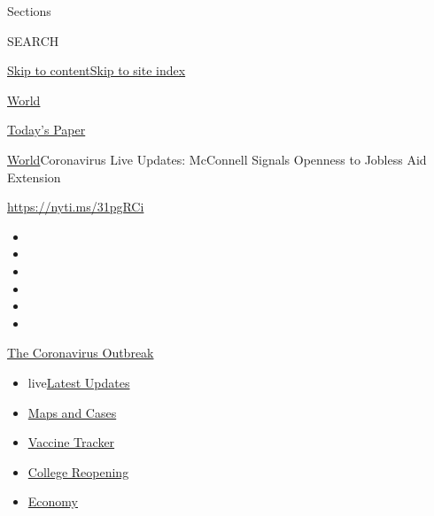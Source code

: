 Sections

SEARCH

\protect\hyperlink{site-content}{Skip to
content}\protect\hyperlink{site-index}{Skip to site index}

\href{https://www.nytimes3xbfgragh.onion/section/world}{World}

\href{https://myaccount.nytimes3xbfgragh.onion/auth/login?response_type=cookie\&client_id=vi}{}

\href{https://www.nytimes3xbfgragh.onion/section/todayspaper}{Today's
Paper}

\href{/section/world}{World}\textbar{}Coronavirus Live Updates:
McConnell Signals Openness to Jobless Aid Extension

\url{https://nyti.ms/31pgRCi}

\begin{itemize}
\item
\item
\item
\item
\item
\item
\end{itemize}

\href{https://www.nytimes3xbfgragh.onion/news-event/coronavirus?action=click\&pgtype=Article\&state=default\&region=TOP_BANNER\&context=storylines_menu}{The
Coronavirus Outbreak}

\begin{itemize}
\tightlist
\item
  live\href{https://www.nytimes3xbfgragh.onion/2020/08/04/world/coronavirus-cases.html?action=click\&pgtype=Article\&state=default\&region=TOP_BANNER\&context=storylines_menu}{Latest
  Updates}
\item
  \href{https://www.nytimes3xbfgragh.onion/interactive/2020/us/coronavirus-us-cases.html?action=click\&pgtype=Article\&state=default\&region=TOP_BANNER\&context=storylines_menu}{Maps
  and Cases}
\item
  \href{https://www.nytimes3xbfgragh.onion/interactive/2020/science/coronavirus-vaccine-tracker.html?action=click\&pgtype=Article\&state=default\&region=TOP_BANNER\&context=storylines_menu}{Vaccine
  Tracker}
\item
  \href{https://www.nytimes3xbfgragh.onion/2020/08/02/us/covid-college-reopening.html?action=click\&pgtype=Article\&state=default\&region=TOP_BANNER\&context=storylines_menu}{College
  Reopening}
\item
  \href{https://www.nytimes3xbfgragh.onion/live/2020/08/04/business/stock-market-today-coronavirus?action=click\&pgtype=Article\&state=default\&region=TOP_BANNER\&context=storylines_menu}{Economy}
\end{itemize}

